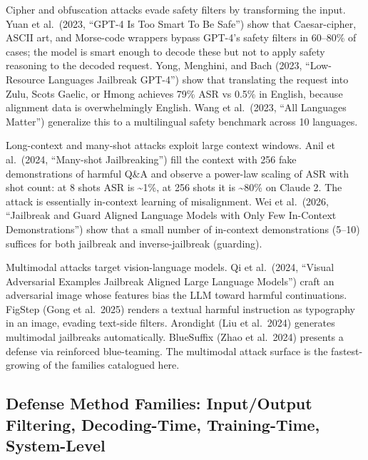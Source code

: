 Cipher and obfuscation attacks evade safety filters by transforming the input. Yuan et al.~(2023, ``GPT-4 Is Too Smart To Be Safe'') show that Caesar-cipher, ASCII art, and Morse-code wrappers bypass GPT-4's safety filters in 60--80\% of cases; the model is smart enough to decode these but not to apply safety reasoning to the decoded request. Yong, Menghini, and Bach (2023, ``Low-Resource Languages Jailbreak GPT-4'') show that translating the request into Zulu, Scots Gaelic, or Hmong achieves 79\% ASR vs 0.5\% in English, because alignment data is overwhelmingly English. Wang et al.~(2023, ``All Languages Matter'') generalize this to a multilingual safety benchmark across 10 languages.

Long-context and many-shot attacks exploit large context windows. Anil et al.~(2024, ``Many-shot Jailbreaking'') fill the context with 256 fake demonstrations of harmful Q\&A and observe a power-law scaling of ASR with shot count: at 8 shots ASR is \textasciitilde1\%, at 256 shots it is \textasciitilde80\% on Claude 2. The attack is essentially in-context learning of misalignment. Wei et al.~(2026, ``Jailbreak and Guard Aligned Language Models with Only Few In-Context Demonstrations'') show that a small number of in-context demonstrations (5--10) suffices for both jailbreak and inverse-jailbreak (guarding).

Multimodal attacks target vision-language models. Qi et al.~(2024, ``Visual Adversarial Examples Jailbreak Aligned Large Language Models'') craft an adversarial image whose features bias the LLM toward harmful continuations. FigStep (Gong et al.~2025) renders a textual harmful instruction as typography in an image, evading text-side filters. Arondight (Liu et al.~2024) generates multimodal jailbreaks automatically. BlueSuffix (Zhao et al.~2024) presents a defense via reinforced blue-teaming. The multimodal attack surface is the fastest-growing of the families catalogued here.

\subsection{Defense Method Families: Input/Output Filtering, Decoding-Time, Training-Time, System-Level}\label{defense-method-families-inputoutput-filtering-decoding-time-training-time-system-level}

